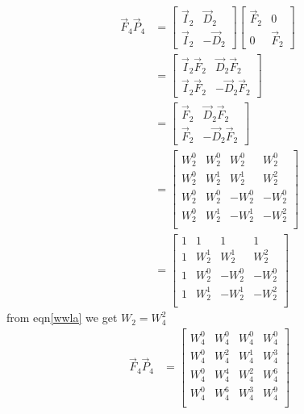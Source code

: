 \documentclass[journal,12pt,twocolumn]{IEEEtran}
\renewcommand\thesection{\arabic{section}}
\begin{document}
\begin{enumerate}[label=\arabic*.,ref=\thesection.\theenumi]
\solution \begin{align}
	\vec{F}_{4}\vec{P}_{4}&=
\begin{bmatrix}
	\vec{I}_{2} & \vec{D}_{2} \\
\vec{I}_{2} & -\vec{D}_{2}
\end{bmatrix}
\begin{bmatrix}
\vec{F}_{2} & 0 \\
0 & \vec{F}_{2}
\end{bmatrix}
\\
&=\begin{bmatrix}
	\vec{I}_{2}\vec{F}_{2} & \vec{D}_{2}\vec{F}_{2} \\
\vec{I}_{2}\vec{F}_{2} & -\vec{D}_{2}\vec{F}_{2}
\end{bmatrix}
\\
&= \begin{bmatrix}
	\vec{F}_{2} & \vec{D}_{2}\vec{F}_{2} \\
\vec{F}_{2} & -\vec{D}_{2}\vec{F}_{2}
\end{bmatrix}
\\
&=\begin{bmatrix}
	W_{2}^{0} &W_{2}^{0} &W_{2}^{0} &W_{2}^{0}\\
	W_{2}^{0} &W_{2}^{1} &W_{2}^{1} &W_{2}^{2}\\
	W_{2}^{0} &W_{2}^{0} &-W_{2}^{0} &-W_{2}^{0}\\
	W_{2}^{0} &W_{2}^{1} &-W_{2}^{1} &-W_{2}^{2}\\
\end{bmatrix}\\
&=\begin{bmatrix}
	1 &1 &1 &1\\
	1 &W_{2}^{1} &W_{2}^{1} &W_{2}^{2}\\
	1 &W_{2}^{0} &-W_{2}^{0} &-W_{2}^{0}\\
	1 &W_{2}^{1} &-W_{2}^{1} &-W_{2}^{2}\\
\end{bmatrix}
\end{align}
from eqn\eqref{wwla} we get $W_{2} = W_{4}^2$
\begin{align}
	\vec{F}_{4}\vec{P}_{4}&=\begin{bmatrix}
		W_{4}^{0}&W_{4}^{0}&W_{4}^{0}&W_{4}^{0}\\
		W_{4}^{0}&W_{4}^{2}&W_{4}^{1}&W_{4}^{3}\\
		W_{4}^{0}&W_{4}^{4}&W_{4}^{2}&W_{4}^{6}\\
		W_{4}^{0}&W_{4}^{6}&W_{4}^{3}&W_{4}^{9}\\
	\end{bmatrix}

\end{align}
\end{enumerate}
\end{document}
